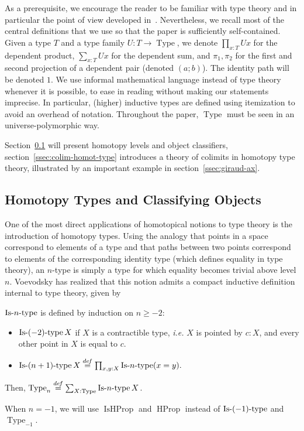 \documentclass[notfinal]{jfrarticle}
\DeclareMathOperator{\Type}{Type}
\DeclareMathOperator{\HProp}{HProp}
\DeclareMathOperator{\IsHProp}{IsHProp}
\newcommand \defeq {\overset{de\hspace{-0.2ex}f}{=}}
\def\mymathhyphen{{\hbox{-}}}
\newcommand{\IsType}[1]
{\mathop{\mathrm{Is\mymathhyphen}#1\mathrm{\mymathhyphen type}} }
\newcommand{\ie}{\emph{i.e.}}
\begin{document}
As a prerequisite, we encourage the reader to be familiar with type theory and
in particular the point of view developed
in~\cite{hottbook}. Nevertheless, we recall most of the central definitions 
that we use so that the paper is sufficiently self-contained.
%
Given a type $T$ and a type family $U : T \to \Type$, we denote
$\prod_{x:T} U x$ for the dependent product, $\sum_{x:T} U x$ for the dependent
sum, and $\pi_1, \pi_2$ for the first and second projection of a
dependent pair (denoted $(a;b)$). The identity path will be denoted
$1$. We use informal mathematical language
instead of type theory whenever it is possible, to ease in reading
without making our statements imprecise. In particular, (higher)
inductive types are defined using itemization to avoid an overhead of
notation. Throughout the paper, $\Type$ must be seen in an
universe-polymorphic way.

Section~\ref{ssec:hott} will present homotopy levels and object
classifiers, section~\ref{ssec:colim-homot-type} introduces a theory
of colimits in homotopy type theory, illustrated by an important
example in section~\ref{ssec:giraud-ax}.

 
 \subsection{Homotopy Types and Classifying Objects}
\label{ssec:hott}

One of the most direct applications of homotopical notions to type
theory is the introduction of homotopy types. 
%
Using the analogy that points in a space correspond to elements of a
type and that paths between two points correspond to 
elements of the corresponding identity type (which defines equality in type theory),  
%
an $n$-type is simply a type
for which equality becomes trivial above level $n$. 
%
Voevodsky has realized that this notion admits a compact inductive definition
internal to type theory, given by
\begin{defi}
  $\IsType n$ is defined by induction on $n\geqslant -2$:
  \begin{itemize}
  \item $\IsType {(-2)} X$ if $X$ is a contractible type, \ie{} $X$
    is pointed by $c:X$, and every other point in $X$ is equal to $c$.
  \item $\IsType {(n+1)} X \defeq \prod_{x,y:X} \IsType n (x=y).$
  \end{itemize}
  Then, $\Type_n \defeq \sum_{X:\Type} \IsType n X$.
\end{defi}
%
When $n=-1$, we will use $\IsHProp$ and $\HProp$ instead of
$\IsType{(-1)}$ and $\Type_{-1}$. 
\end{document}
